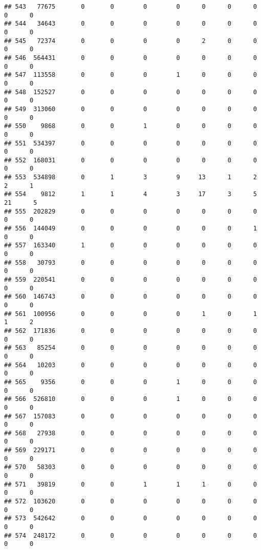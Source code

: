 \documentclass[
]{article}
\begin{document}
\begin{verbatim}
## 543   77675       0       0        0        0      0      0      0     0      0
## 544   34643       0       0        0        0      0      0      0     0      0
## 545   72374       0       0        0        0      2      0      0     0      0
## 546  564431       0       0        0        0      0      0      0     0      0
## 547  113558       0       0        0        1      0      0      0     0      0
## 548  152527       0       0        0        0      0      0      0     0      0
## 549  313060       0       0        0        0      0      0      0     0      0
## 550    9868       0       0        1        0      0      0      0     0      0
## 551  534397       0       0        0        0      0      0      0     0      0
## 552  168031       0       0        0        0      0      0      0     0      0
## 553  534898       0       1        3        9     13      1      2     2      1
## 554    9812       1       1        4        3     17      3      5    21      5
## 555  202829       0       0        0        0      0      0      0     0      0
## 556  144049       0       0        0        0      0      0      1     0      0
## 557  163340       1       0        0        0      0      0      0     0      0
## 558   30793       0       0        0        0      0      0      0     0      0
## 559  220541       0       0        0        0      0      0      0     0      0
## 560  146743       0       0        0        0      0      0      0     0      0
## 561  100956       0       0        0        0      1      0      1     1      2
## 562  171836       0       0        0        0      0      0      0     0      0
## 563   85254       0       0        0        0      0      0      0     0      0
## 564   10203       0       0        0        0      0      0      0     0      0
## 565    9356       0       0        0        1      0      0      0     0      0
## 566  526810       0       0        0        1      0      0      0     0      0
## 567  157083       0       0        0        0      0      0      0     0      0
## 568   27938       0       0        0        0      0      0      0     0      0
## 569  229171       0       0        0        0      0      0      0     0      0
## 570   58303       0       0        0        0      0      0      0     0      0
## 571   39819       0       0        1        1      1      0      0     0      0
## 572  103620       0       0        0        0      0      0      0     0      0
## 573  542642       0       0        0        0      0      0      0     0      0
## 574  248172       0       0        0        0      0      0      0     0      0

\end{verbatim}
\end{document}
